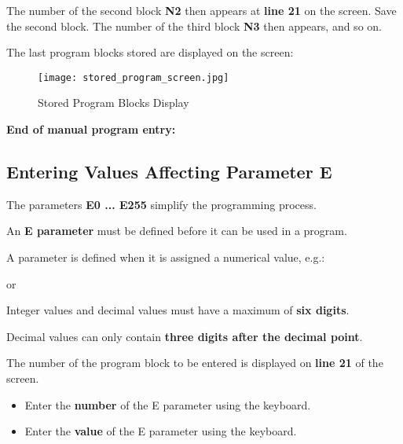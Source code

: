 \vspace{.5cm}

The number of the second block \textbf{N2} then appears at \textbf{line 21} on the screen. Save the second block. The number of the third block \textbf{N3} then appears, and so on.

The last program blocks stored are displayed on the screen:

\begin{figure}[h]
    \centering
    \texttt{[image: stored\_program\_screen.jpg]}
    \caption{Stored Program Blocks Display}
\end{figure}

\textbf{End of manual program entry:}

\begin{itemize}
\end{itemize}

\newpage

\subsection{Entering Values Affecting Parameter E}

The parameters \textbf{E0 ... E255} simplify the programming process.

An \textbf{E parameter} must be defined before it can be used in a program.

A parameter is defined when it is assigned a numerical value, e.g.:

\begin{center}
     \quad or \quad {}
\end{center}

Integer values and decimal values must have a maximum of \textbf{six digits}.

Decimal values can only contain \textbf{three digits after the decimal point}.

\procedure

The number of the program block to be entered is displayed on \textbf{line 21} of the screen.

\begin{itemize}
    \item Enter the \textbf{number} of the E parameter using the keyboard.
    \vspace{.5cm}
    \item Enter the \textbf{value} of the E parameter using the keyboard.
    \vspace{.6cm}
\end{itemize}

